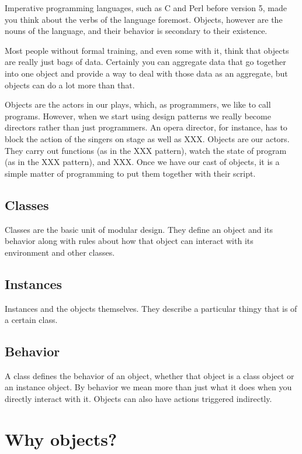 Imperative programming languages, such as C and Perl before
version 5, made you think about the verbs of the language
foremost. Objects, however are the nouns of the language, and
their behavior is secondary to their existence.

Most people without formal training, and even some with it,
think that objects are really just bags of data.  Certainly you
can aggregate data that go together into one object and provide
a way to deal with those data as an aggregate, but objects can
do a lot more than that.

Objects are the actors in our plays, which, as programmers, we
like to call programs.  However, when we start using design
patterns we really become directors rather than just
programmers. An opera director, for instance, has to block the
action of the singers on stage as well as XXX.  Objects are our
actors.  They carry out functions (as in the XXX pattern),
watch the state of program (as in the XXX pattern), and XXX. 
Once we have our cast of objects, it is a simple matter of
programming to put them together with their script.

        \subsection{Classes}

Classes are the basic unit of modular design.  They define an
object and its behavior along with rules about how that object
can interact with its environment and other classes.

        \subsection{Instances}

Instances and the objects themselves.  They describe a particular
thingy that is of a certain class.

        \subsection{Behavior}

A class defines the behavior of an object, whether that object
is a class object or an instance object.  By behavior we mean
more than just what it does when you directly interact with it.
Objects can also have actions triggered indirectly.


    \section{Why objects?}


